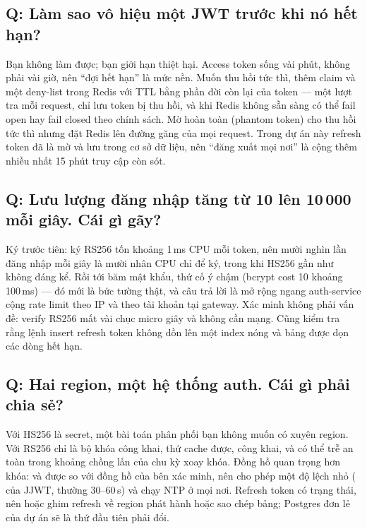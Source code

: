 \subsection*{Q: Làm sao vô hiệu một JWT trước khi nó hết hạn?}

Bạn không làm được; bạn giới hạn thiệt hại. Access token sống vài phút,
không phải vài giờ, nên ``đợi hết hạn'' là mức nền. Muốn thu hồi tức
thì, thêm claim  và một deny-list trong Redis với TTL bằng
phần đời còn lại của token --- một lượt tra mỗi request, chỉ lưu token
bị thu hồi, và khi Redis không sẵn sàng có thể fail open hay fail closed
theo chính sách. Mờ hoàn toàn (phantom token) cho thu hồi tức thì nhưng
đặt Redis lên đường găng của mọi request. Trong dự án này refresh token
đã là mờ và lưu trong cơ sở dữ liệu, nên ``đăng xuất mọi nơi'' là
 cộng thêm nhiều
nhất 15 phút truy cập còn sót.

\subsection*{Q: Lưu lượng đăng nhập tăng từ 10 lên 10\,000 mỗi giây. Cái gì gãy?}

Ký trước tiên: ký RS256 tốn khoảng 1\,ms CPU mỗi token, nên mười nghìn
lần đăng nhập mỗi giây là mười nhân CPU chỉ để ký, trong khi HS256 gần
như không đáng kể. Rồi tới băm mật khẩu, thứ cố ý chậm (bcrypt cost 10
khoảng 100\,ms) --- đó mới là bức tường thật, và câu trả lời là mở rộng
ngang auth-service cộng rate limit theo IP và theo tài khoản tại
gateway. Xác minh không phải vấn đề: verify RS256 mất vài chục micro
giây và không cần mạng. Cũng kiểm tra rằng lệnh insert refresh token
không dồn lên một index nóng và bảng  được dọn các
dòng hết hạn.

\subsection*{Q: Hai region, một hệ thống auth. Cái gì phải chia sẻ?}

Với HS256 là secret, một bài toán phân phối bạn không muốn có xuyên
region. Với RS256 chỉ là bộ khóa công khai, thứ cache được, công khai,
và có thể trễ an toàn trong khoảng chồng lấn của chu kỳ xoay khóa. Đồng
hồ quan trọng hơn khóa:  và  được so với đồng hồ
của bên xác minh, nên cho phép một độ lệch nhỏ (
của JJWT, thường 30--60\,s) và chạy NTP ở mọi nơi. Refresh token có
trạng thái, nên hoặc ghim refresh về region phát hành hoặc sao chép
bảng; Postgres đơn lẻ của dự án sẽ là thứ đầu tiên phải đổi.

